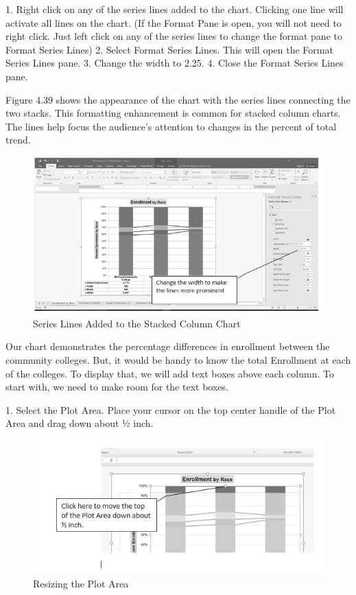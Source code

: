 1. Right click on any of the series lines added to the chart. Clicking one line will activate all lines
on the chart. (If the Format Pane is open, you will not need to right click. Just left click on any of
the series lines to change the format pane to Format Series Lines)
2. Select Format Series Lines. This will open the Format Series Lines pane.
3. Change the width to 2.25.
4. Close the Format Series Lines pane.

Figure 4.39 shows the appearance of the chart with the series lines connecting the two stacks. This
formatting enhancement is common for stacked column charts. The lines help focus the audience’s
attention to changes in the percent of total trend.



\begin{figure}[H]
	\centering
	\includegraphics[width=\maxwidth{.95\linewidth}]{gfx/ch04_fig42}
	\caption{Series Lines Added to the Stacked Column Chart}
	\label{04:fig42}
\end{figure}


Our chart demonstrates the percentage differences in enrollment between the community colleges.
But, it would be handy to know the total Enrollment at each of the colleges. To display that, we will
add text boxes above each column. To start with, we need to make room for the text boxes.

1. Select the Plot Area. Place your cursor on the top center handle of the Plot Area and drag down
about ½ inch.


\begin{figure}[H]
	\centering
	\includegraphics[width=\maxwidth{.95\linewidth}]{gfx/ch04_fig43}
	\caption{Resizing the Plot Area}
	\label{04:fig43}
\end{figure}


